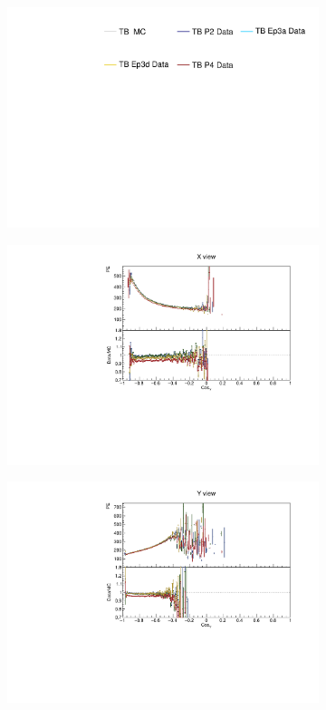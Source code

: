 \begin{figure}[!ht]
  \begin{subfigure}{\textwidth}
  \centering
    \includegraphics[height=0.2\linewidth]{essentialsec_tb/legend.pdf}
  \end{subfigure}
  \vspace*{2mm}

  \begin{subfigure}{0.5\textwidth}
    \includegraphics[width=\linewidth]{PlotsAngularDistribution/pe_cosy_x.pdf}
  \end{subfigure}
  \begin{subfigure}{0.5\textwidth}
    \includegraphics[width=\linewidth]{PlotsAngularDistribution/pe_cosy_y.pdf}

\end{subfigure}
\end{figure}
